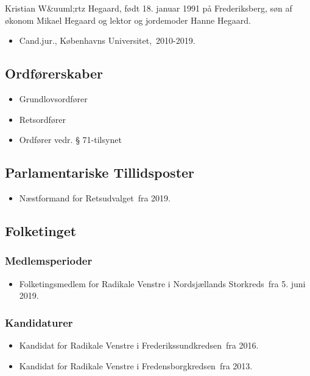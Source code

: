 \documentclass[11pt, a4paper]{awesome-cv}
\begin{document}
\makecvheader[R]
\makelettertitle
\begin{cvletter}
Kristian W&uuml;rtz Hegaard, født 18. januar 1991 på Frederiksberg, søn af økonom Mikael Hegaard og lektor og jordemoder Hanne Hegaard.

\begin{itemize}
\item Cand.jur., Københavns Universitet, 2010-2019.
\end{itemize}
\subsection*{Ordførerskaber}
\begin{itemize}
\item Grundlovsordfører
\item Retsordfører
\item Ordfører vedr. § 71-tilsynet 
\end{itemize}
\subsection*{Parlamentariske Tillidsposter}
\begin{itemize}
\item Næstformand for Retsudvalget fra 2019.
\end{itemize}
\subsection*{Folketinget}
\subsubsection*{Medlemsperioder}
\begin{itemize}
\item Folketingsmedlem for Radikale Venstre i Nordsjællands Storkreds fra 5. juni 2019.
\end{itemize}
\subsubsection*{Kandidaturer}
\begin{itemize}
\item Kandidat for Radikale Venstre i Frederikssundkredsen fra 2016.
\item Kandidat for Radikale Venstre i Fredensborgkredsen fra 2013.
\end{itemize}
\end{cvletter}
\end{document}
